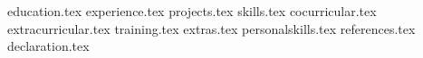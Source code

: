 \documentclass[11pt, a4paper]{awesome-cv}
\newcommand*{\sectiondir}{resume/}
\begin{document}
\makecvheader

{education.tex}
{experience.tex}
{projects.tex}
{skills.tex}
{cocurricular.tex}
{extracurricular.tex}
{training.tex}
{extras.tex}
{personalskills.tex}
{references.tex}
{declaration.tex}
\end{document}
